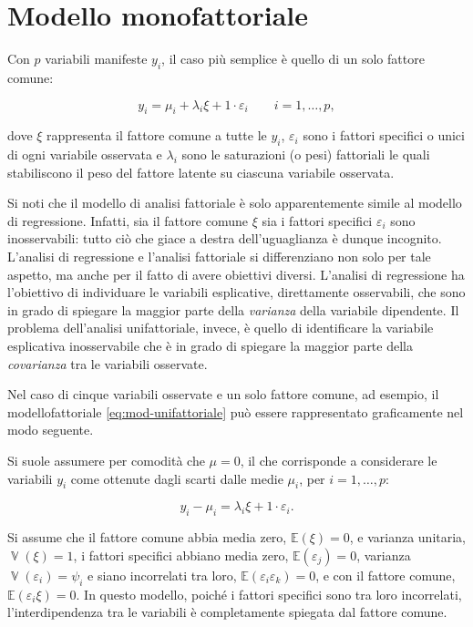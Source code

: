 \documentclass[
  11pt,
]{krantz}
\DeclareMathOperator{\V}{\mathbb{V}} %
\newcommand{\E}{\mathbb{E}} %
\theoremstyle{definition}
\theoremstyle{definition}
\theoremstyle{definition}
\theoremstyle{definition}
\theoremstyle{remark}
\begin{document}
\hypertarget{modello-monofattoriale}{%
\section{Modello monofattoriale}\label{modello-monofattoriale}}

Con \(p\) variabili manifeste \(y_i\), il caso più semplice è quello di un solo fattore comune:

\begin{equation}
y_i = \mu_i + \lambda_{i} \xi +  1 \cdot \varepsilon_i \qquad i=1, \dots, p,
\label{eq:mod-unifattoriale}
\end{equation}

dove \(\xi\) rappresenta il fattore comune a tutte le \(y_i\), \(\varepsilon_i\) sono i fattori specifici o unici di ogni variabile osservata e \(\lambda_i\) sono le saturazioni (o pesi) fattoriali le quali stabiliscono il peso del fattore latente su ciascuna variabile osservata.

Si noti che il modello di analisi fattoriale è solo apparentemente simile al modello di regressione. Infatti, sia il fattore comune \(\xi\) sia i fattori specifici \(\varepsilon_i\) sono inosservabili: tutto ciò che giace a destra dell'uguaglianza è dunque incognito. L'analisi di regressione e l'analisi fattoriale si differenziano non solo per tale aspetto, ma anche per il fatto di avere obiettivi diversi. L'analisi di regressione ha l'obiettivo di individuare le variabili esplicative, direttamente osservabili, che sono in grado di spiegare la maggior parte della \emph{varianza} della variabile dipendente. Il problema dell'analisi unifattoriale, invece, è quello di identificare la variabile esplicativa inosservabile che è in grado di spiegare la maggior parte della \emph{covarianza} tra le variabili osservate.

Nel caso di cinque variabili osservate e un solo fattore comune, ad esempio, il modellofattoriale \eqref{eq:mod-unifattoriale} può essere rappresentato graficamente nel modo seguente.

Si suole assumere per comodità che \(\mu=0\), il che corrisponde a considerare le variabili \(y_i\) come ottenute dagli scarti dalle medie \(\mu_i\), per \(i = 1, \dots, p\):

\begin{equation}
y_i -\mu_i = \lambda_i \xi + 1 \cdot \varepsilon_i.
\label{eq:mod-monofattoriale}
\end{equation}

Si assume che il fattore comune abbia media zero, \(\E(\xi)=0\), e varianza unitaria, \(\V(\xi)=1\), i fattori specifici abbiano media zero, \(\E(\varepsilon_j)=0\), varianza \(\V(\varepsilon_i)=\psi_{i}\) e siano incorrelati tra loro, \(\E(\varepsilon_i \varepsilon_k)=0\), e con il fattore comune, \(\E(\varepsilon_i \xi)=0\). In questo modello, poiché i fattori specifici sono tra loro incorrelati, l'interdipendenza tra le variabili è completamente spiegata dal fattore comune.
\end{document}
